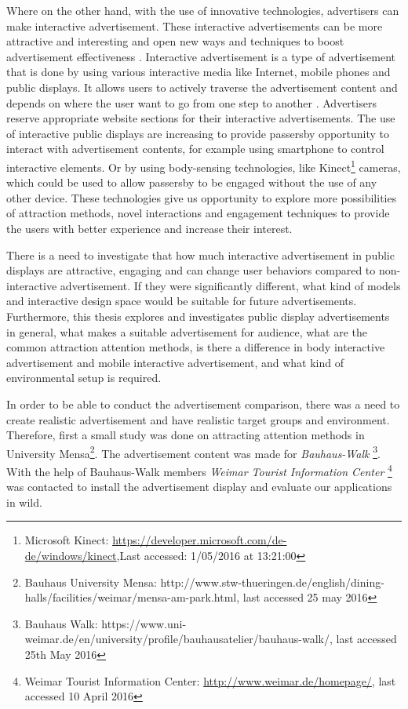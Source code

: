 Where on the other hand, with the use of innovative technologies, advertisers can make interactive advertisement. These interactive advertisements can be more attractive and interesting and open new ways and techniques to boost advertisement effectiveness \cite{add_effectivenss}. Interactive advertisement is a type of advertisement that is done by using various interactive media like Internet, mobile phones and public displays. It allows users to actively traverse the advertisement content and depends on where the user want to go from one step to another \cite{Non_inter_vs_interAd}. Advertisers reserve appropriate website sections for their interactive advertisements. The use of interactive public displays are increasing to provide passersby opportunity to interact with advertisement contents, for example using smartphone to control interactive elements. Or by using body-sensing technologies, like Kinect\footnote{Microsoft Kinect: \url{https://developer.microsoft.com/de-de/windows/kinect},Last accessed: 1/05/2016 at 13:21:00} cameras, which could be used to allow passersby to be engaged without the use of any other device. These technologies give us opportunity to explore more possibilities of attraction methods, novel interactions and engagement techniques to provide the users with better experience and increase their interest. 

There is a need to investigate that how much interactive advertisement in public displays are attractive, engaging and can change user behaviors compared to non-interactive advertisement. If they were significantly different, what kind of models and interactive design space would be suitable for future advertisements. Furthermore, this thesis explores and investigates public display advertisements in general, what makes a suitable advertisement for audience, what are the common attraction attention methods, is there a difference in body interactive advertisement and mobile interactive advertisement, and what kind of environmental setup is required.

In order to be able to conduct the advertisement comparison, there was a need to create realistic advertisement and have realistic target groups and environment. Therefore, first a small study was done on attracting attention methods in University Mensa\footnote{Bauhaus University Mensa: http://www.stw-thueringen.de/english/dining-halls/facilities/weimar/mensa-am-park.html, last accessed 25 may 2016}. The advertisement content was made for \emph{Bauhaus-Walk} \footnote{Bauhaus Walk: https://www.uni-weimar.de/en/university/profile/bauhausatelier/bauhaus-walk/, last accessed 25th May 2016}. With the help of Bauhaus-Walk members \emph{Weimar Tourist Information Center} \footnote{Weimar Tourist Information Center: \url{http://www.weimar.de/homepage/}, last accessed 10 April 2016} was contacted to install the advertisement display and evaluate our applications in wild.



